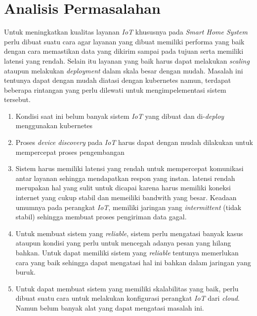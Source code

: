 \section{Analisis Permasalahan}
\label{sec:analisis-permasalahan}

Untuk meningkatkan kualitas layanan \textit{IoT} khususnya pada \textit{Smart Home System} perlu dibuat suatu cara agar layanan yang dibuat memiliki performa yang baik dengan cara memastikan data yang dikirim sampai pada tujuan serta memiliki latensi yang rendah. Selain itu layanan yang baik harus dapat melakukan \textit{scaling} ataupun melakukan \textit{deployment} dalam skala besar dengan mudah. Masalah ini tentunya dapat dengan mudah diatasi dengan kubernetes namun, terdapat beberapa rintangan yang perlu dilewati untuk mengimpelementasi sistem tersebut.

\begin{enumerate}
  \item Kondisi saat ini belum banyak sistem \textit{IoT} yang dibuat dan di-\textit{deploy} menggunakan kubernetes
  \item Proses \textit{device discovery} pada \textit{IoT} harus dapat dengan mudah dilakukan untuk mempercepat proses pengembangan
  \item Sistem harus memiliki latensi yang rendah untuk mempercepat komunikasi antar layanan sehingga mendapatkan respon yang instan. latensi rendah merupakan hal yang sulit untuk dicapai karena harus memiliki koneksi internet yang cukup stabil dan memeiliki bandwith yang besar. Keadaan umumnya pada perangkat \textit{IoT}, memiliki jaringan yang \textit{intermittent} (tidak stabil) sehingga membuat proses pengiriman data gagal.
  \item Untuk membuat sistem yang \textit{reliable}, sistem perlu mengatasi banyak kasus ataupun kondisi yang perlu untuk mencegah adanya pesan yang hilang bahkan. Untuk dapat memiliki sistem yang \textit{reliable} tentunya memerlukan cara yang baik sehingga dapat mengatasi hal ini bahkan dalam jaringan yang buruk.
  \item Untuk dapat membuat sistem yang memiliki skalabilitas yang baik, perlu dibuat suatu cara untuk melakukan konfigurasi perangkat \textit{IoT} dari \textit{cloud}. Namun belum banyak alat yang dapat mengatasi masalah ini.
\end{enumerate}
